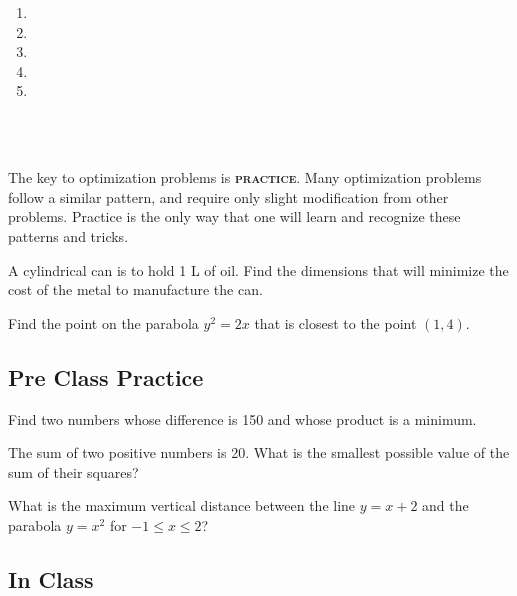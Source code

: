 \documentclass[notes]{subfiles}
\begin{document}
		\begin{rmk}
			\begin{enumerate}[(1)]
			\setlength\itemsep{55pt}
				\item 
				\item 
				\item 
				\item 
				\item
			\end{enumerate}\\ \\
		\end{rmk}
		
		The key to optimization problems is \textsc{\textbf{practice}}.  Many optimization problems follow a similar pattern, and require only slight modification from other problems.  Practice is the only way that one will learn and recognize these patterns and tricks.
		\newpage
		
		\begin{ex}
			A cylindrical can is to hold 1 L of oil.  Find the dimensions that will minimize the cost of the metal to manufacture the can.
		\end{ex}
			
			
		\begin{ex}
			Find the point on the parabola \(y^2 = 2x\) that is closest to the point \((1,4)\).
		\end{ex}
			\newpage
			
	\subsection*{Pre Class Practice}
		\begin{ex}
			Find two numbers whose difference is 150 and whose product is a minimum.
		\end{ex}
			
		\begin{ex}
			The sum of two positive numbers is 20.  What is the smallest possible value of the sum of their squares?
		\end{ex}
		
		\begin{ex}
			What is the maximum vertical distance between the line \(y=x+2\) and the parabola \(y=x^2\) for \(-1\leq x\leq 2\)?
		\end{ex}
			\newpage
			
	\subsection*{In Class}	
\end{document}
